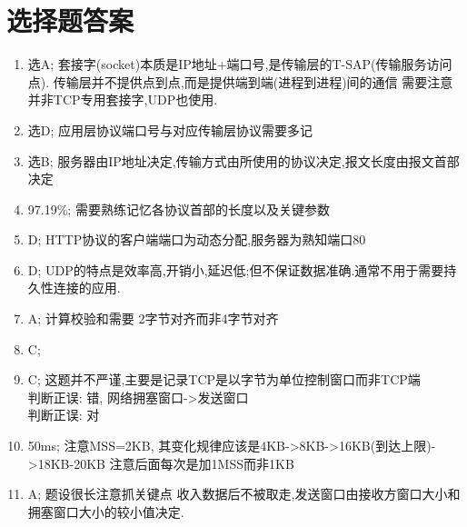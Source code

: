 \documentclass[12pt, a4paper, oneside, UTF8]{ctexbook}
\begin{document}
\newpage

\section{选择题答案}
\begin{enumerate}
    \item 选A; 套接字(socket)本质是IP地址+端口号,是传输层的T-SAP(传输服务访问点). 传输层并不提供{\color{red}点到点,而是提供端到端(进程到进程)间的通信}
    需要注意并非TCP专用套接字,UDP也使用. 
    \item 选D; 应用层协议端口号与对应传输层协议需要多记
    \item 选B; 服务器由IP地址决定,传输方式由所使用的协议决定,报文长度由报文首部决定
    \item 97.19\%; 需要熟练记忆各协议首部的长度以及关键参数 
    \item D; HTTP协议的客户端端口为动态分配,服务器为熟知端口80
    \item D; UDP的特点是效率高,开销小,延迟低;但不保证数据准确.通常不用于需要持久性连接的应用.
    \item A; 计算校验和需要{\color{red} 2字节对齐而非4字节对齐} 
    \item C;
    \item C; 这题并不严谨,主要是记录TCP是以字节为单位控制窗口而非TCP端 \\
    判断正误: 错, 网络拥塞窗口->发送窗口 \\
    判断正误: 对
    \item 50ms; 注意MSS=2KB, 其变化规律应该是4KB->8KB->16KB(到达上限)->18KB-20KB 注意后面每次是加1MSS而非1KB
    \item A; 题设很长注意抓关键点{\color{red} 收入数据后不被取走},发送窗口由接收方窗口大小和拥塞窗口大小的较小值决定.
\end{enumerate}
\ifx\allfiles\undefined
\end{document}

